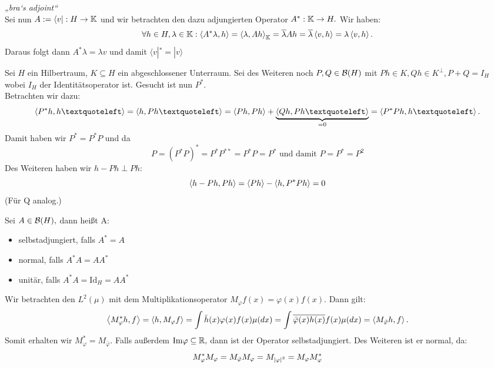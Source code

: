 \begin{ex} \label{bras_adj} \textit{„bra‘s adjoint“} \\ 
    Sei nun $A := \langle v |: H \to \mathbb{K}$ und wir betrachten den dazu adjungierten Operator $A^*: \mathbb{K} \to H.$  Wir haben: \[\forall h \in H, \lambda \in \mathbb{K}: \left\langle A^* \lambda, h\right\rangle = \left\langle\lambda, Ah\right\rangle_{\mathbb{K}} = \overline{\lambda}Ah = \overline{\lambda} \left\langle v, h\right\rangle = \lambda \left\langle v, h\right\rangle.\] Daraus folgt dann $A^*\lambda = \lambda v$ und damit $\langle v |^* = | v \rangle$
\end{ex}

\begin{ex} Sei $H$ ein Hilbertraum, $K \subseteq H$ ein abgeschlossener Unterraum.
	Sei des Weiteren noch $P, Q \in \mathcal{B}(H)$ mit $Ph \in K, Qh \in K^{\perp}, P + Q = I_H$ wobei $I_H$ der Identitätsoperator ist.  Gesucht ist nun $P^*.$ \\
Betrachten wir dazu: \[\ip{P^*h, h‘} = \ip{h, Ph‘} = \ip{Ph, Ph} + \underbrace{\ip{Qh, Ph‘}}_{= 0} = \ip{P^*Ph, h‘}.\] Damit haben wir $P^* = P^{*}P$ und da \[P = (P^*P)^* = P^*P^{**} = P^*P = P^* \text{ und damit } P = P^* = P^2\] Des Weiteren haben wir $h-Ph \perp Ph$:
\[\left\langle h-Ph, Ph\right\rangle = \left\langle Ph\right\rangle- \left\langle h, P^*Ph\right\rangle = 0\] (Für Q analog.)
\end{ex}

\begin{definition} Sei $A \in \mathcal{B}(H),$ dann heißt A:
	\begin{itemize}
		\item selbstadjungiert, falls $A^* = A$
		\item normal, falls $A^*A = AA^*$
		\item unitär, falls $A^*A = \text{Id}_H = AA^*$
	\end{itemize}
\end{definition}

\begin{ex}
	Wir betrachten den $L^2(\mu)$ mit dem Multiplikationsoperator $M_{\varphi}f(x) = \varphi(x)f(x).$ Dann gilt: \[\left\langle M_{\varphi}^*h, f\right\rangle = \left\langle h, M_{\varphi}f\right\rangle = \int \bar h(x) \varphi(x)f(x)\mu(dx) = \int \overline{\bar \varphi(x) h(x)}f(x) \mu(dx) = \left\langle M_{\bar \varphi}h, f\right\rangle.\] Somit erhalten wir $M_{\varphi}^* = M_{\bar \varphi}.$ Falls außerdem $\text{Im} \varphi \subseteq \mathbb{R},$ dann ist der Operator selbstadjungiert. Des Weiteren ist er normal, da: \[M_{\varphi}^*M_{\varphi} = M_{\bar \varphi}M_{\varphi} = M_{\left\lvert \varphi \right\rvert^2} = M_{\varphi}M_{\varphi}^*\]
\end{ex}